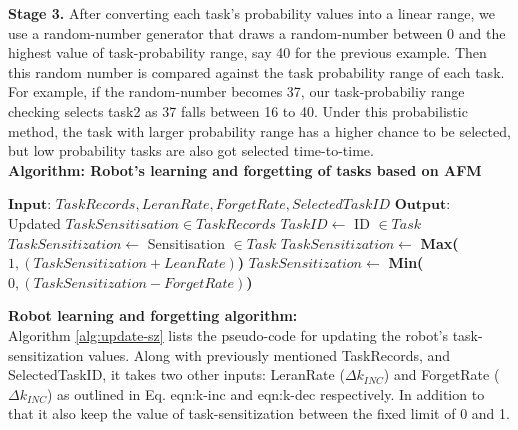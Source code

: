 \textbf{Stage 3.} After converting each task's probability values into a linear range, we use a random-number generator that draws a random-number between 0 and the highest value of task-probability range, say 40 for the previous example. Then this random number is compared against the task probability range of each task. For example, if the random-number becomes 37, our task-probabiliy range checking selects task2 as 37 falls between 16 to 40. Under this probabilistic method, the task with larger probability range has a  higher chance to be selected, but low probability tasks are also got selected time-to-time.\\
\textbf{Algorithm: Robot's learning and forgetting of tasks based on AFM}
\begin{small}
\begin{algorithmic}[1]
\label{alg:update-sz}
\State $\textbf{Input: }  TaskRecords, LeranRate, ForgetRate, SelectedTaskID$
\State $\textbf{Output: }$ Updated $TaskSensitisation \in TaskRecords$
\State $ TaskID \gets  $ ID $\in Task$
\State $ TaskSensitization \gets  $   Sensitisation $ \in Task$
\State $ TaskSensitization \gets $ \textbf{Max(}$1, (TaskSensitization + LeanRate)$\textbf{)}
\Else
\State $ TaskSensitization \gets $ \textbf{Min(}$0, (TaskSensitization - ForgetRate)$\textbf{)}
\EndIf
\EndFor
\end{algorithmic}
\end{small}
\textbf{Robot learning and forgetting algorithm:}\\
Algorithm \ref{alg:update-sz} lists the pseudo-code for updating the robot's task-sensitization values. Along with previously mentioned TaskRecords, and  SelectedTaskID, it takes two other inputs: LeranRate ($\Delta k_{INC} $) and ForgetRate ($\Delta k_{INC} $) as outlined in Eq. {eqn:k-inc} and {eqn:k-dec} respectively.  In addition to that it also keep the value of task-sensitization between the fixed limit of 0 and 1.

